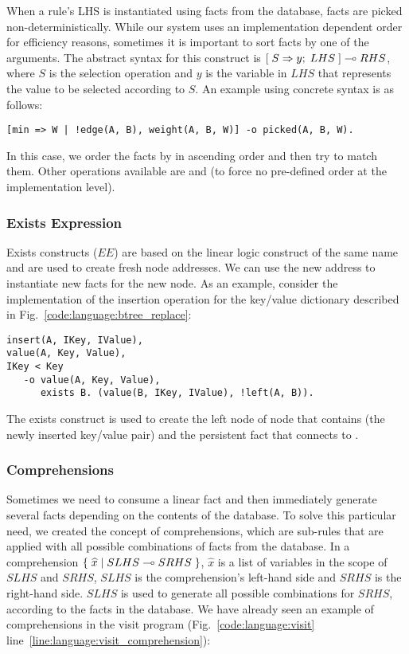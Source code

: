 When a rule's LHS is instantiated using facts from the database, facts are
picked non-deterministically. While our system uses an implementation dependent
order for efficiency reasons, sometimes it is important to sort facts by one of
the arguments. The abstract syntax for this construct is
$[\; S \Rightarrow y; \; LHS \;] \multimap RHS$, where $S$ is the selection operation and $y$ is the
variable in $LHS$ that represents the value to be selected according to $S$. An
example using concrete syntax is as follows:

\begin{Verbatim}[fontsize=\codesize]
[min => W | !edge(A, B), weight(A, B, W)] -o picked(A, B, W).
\end{Verbatim}

In this case, we order the  facts by  in ascending order
and then try to match them. Other operations available are  and
 (to force no pre-defined order at the implementation level).

\subsubsection{Exists Expression}

Exists constructs ($EE$) are based on the linear logic construct of the same name
and are used to create fresh node addresses. We can use the new address to
instantiate new facts for the new node. As an example, consider the implementation of the
insertion operation for the key/value dictionary described in
Fig.~\ref{code:language:btree_replace}:

\begin{Verbatim}[fontsize=\codesize]
insert(A, IKey, IValue),
value(A, Key, Value),
IKey < Key
   -o value(A, Key, Value),
      exists B. (value(B, IKey, IValue), !left(A, B)).
\end{Verbatim}

The exists construct is used to create the left node of node  that
contains  (the newly inserted key/value pair) and
the persistent fact  that connects  to .

\subsubsection{Comprehensions}

Sometimes we need to consume a linear fact and then immediately generate several
facts depending on the contents of the database. To solve this particular need,
we created the concept of comprehensions, which are sub-rules that are applied
with all possible combinations of facts from the database. In a comprehension
$\{ \; \widehat{x} \; | \; SLHS \multimap SRHS \; \}$, $\widehat{x}$ is a list of variables
in the scope of $SLHS$ and $SRHS$, $SLHS$ is the comprehension's left-hand side
and $SRHS$ is the right-hand side. $SLHS$ is used to generate all possible
combinations for $SRHS$, according to the facts in the database. We have already
seen an example of comprehensions in the visit program
(Fig.~\ref{code:language:visit} line~\ref{line:language:visit_comprehension}):

